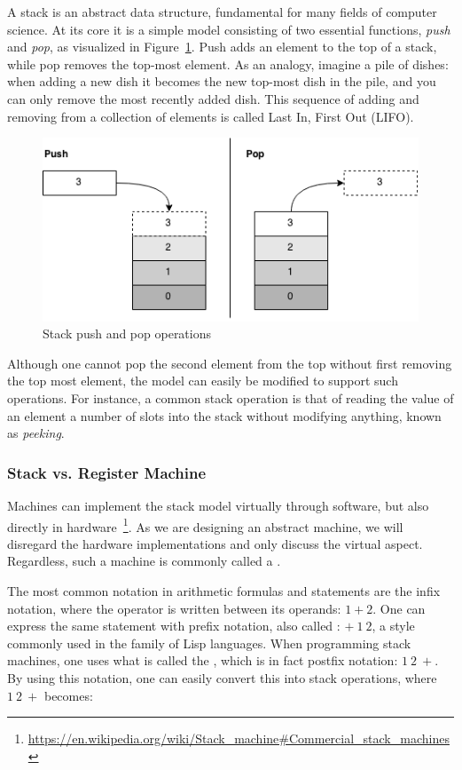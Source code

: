 A stack is an abstract data structure, fundamental for many fields of computer
science. At its core it is a simple model consisting of two essential functions,
{\it push} and {\it pop}, as visualized in Figure~\ref{fig:stack}. Push adds an
element to the top of a stack, while pop removes the top-most element. As an
analogy, imagine a pile of dishes: when adding a new dish it becomes the new
top-most dish in the pile, and you can only remove the most recently added
dish. This sequence of adding and removing from a collection of elements is
called Last In, First Out (LIFO).
\begin{figure}[h]
  \centering
  \includegraphics[scale=0.6]{images/stack.png}
  \caption{Stack push and pop operations}
\label{fig:stack}
\end{figure}

Although one cannot pop the second element from the top without first removing
the top most element, the model can easily be modified to support such
operations. For instance, a common stack operation is that of reading the value
of an element a number of slots into the stack without modifying anything, known
as {\it peeking}.

\subsubsection{Stack vs. Register Machine}

Machines can implement the stack model virtually through software, but also
directly in
hardware~\footnote{\url{https://en.wikipedia.org/wiki/Stack_machine#Commercial_stack_machines}}. As
we are designing an abstract machine, we will disregard the hardware
implementations and only discuss the virtual aspect. Regardless, such a machine
is commonly called a . %

The most common notation in arithmetic formulas and statements are the infix
notation, where the operator is written between its operands: $1 + 2$. One can
express the same statement with prefix notation, also called : $+\ 1\ 2$, a style commonly used in the family of Lisp
languages. When programming stack machines, one uses what is called the
, which is in fact postfix notation: $1\ 2\ +$. By
using this notation, one can easily convert this into stack operations, where
$1\ 2\ +$ becomes:
\begin{stackops}
\end{stackops}

